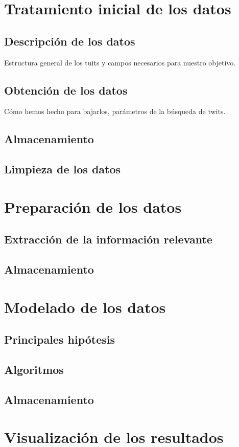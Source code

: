 \documentclass[11pt,a4paper,leqno,titlepage,twoside]{book}
\begin{document}
\chapter{Tratamiento inicial de los datos}
\section{Descripci\'on de los datos}
Estructura general de los tuits y campos necesarios para nuestro objetivo. 
\section{Obtenci\'on de los datos}
C\'omo hemos hecho para bajarlos, par\'ametros de la b\'usqueda de twits.
\section{Almacenamiento}
\section{Limpieza de los datos}

\chapter{Preparaci\'on de los datos}
\section{Extracci\'on de la informaci\'on relevante}
\section{Almacenamiento}

\chapter{Modelado de los datos}
\section{Principales hip\'otesis}
\section{Algoritmos}
\section{Almacenamiento}

\chapter{Visualizaci\'on de los resultados}
\end{document}
